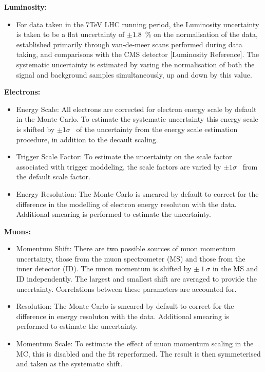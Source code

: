 \vspace{5mm}
\noindent
\textbf{Luminosity:}
\begin{itemize} 
     \item For data taken in the 7TeV LHC running period, the Luminosity uncertainty is taken to be a flat uncertainty of $\pm1.8$~\% on the normalisation of the data, established primarily through van-de-meer scans performed during data taking, and comparisons with the CMS detector [Luminosity Reference]. The systematic uncertainty is estimated by varing the normalisation of both the signal and background samples simultaneously, up and down by this value.
\end{itemize}

\vspace{5mm}
\noindent
\textbf{Electrons:}
\begin{itemize}
    \item Energy Scale: All electrons are corrected for electron energy scale by default in the Monte Carlo. To estimate the systematic uncertainty this energy scale is shifted by $\pm 1\sigma$~ of the uncertainty from the energy scale estimation procedure, in addition to the decault scaling. 
    \item Trigger Scale Factor: To estimate the uncertainty on the scale factor associated with trigger moddeling, the scale factors are varied by $\pm 1\sigma$~ from the default scale factor.
    \item Energy Resolution: The Monte Carlo is smeared by default to correct for the difference in the modelling of electron energy resoluton with the data. Additional smearing is performed to estimate the uncertainty.
\end{itemize}

\vspace{5mm}
\noindent
\textbf{Muons:}
\begin{itemize}
    \item Momentum Shift: There are two possible sources of muon momentum uncertainty, those from the muon spectrometer (MS) and those from the inner detector (ID). The muon momentum is shifted by $\pm~1~\sigma$ in the MS and ID independently. The largest and smallest shift are averaged to provide the uncertainty. Correlations between these parameters are accounted for.
    \item Resolution: The Monte Carlo is smeared by default to correct for the difference in energy resoluton with the data. Additional smearing is performed to estimate the uncertainty.
    \item Momentum Scale: To estimate the effect of muon momentum scaling in the MC, this is disabled and the fit reperformed. The result is then symmeterised and taken as the systematic shift.
\end{itemize}

